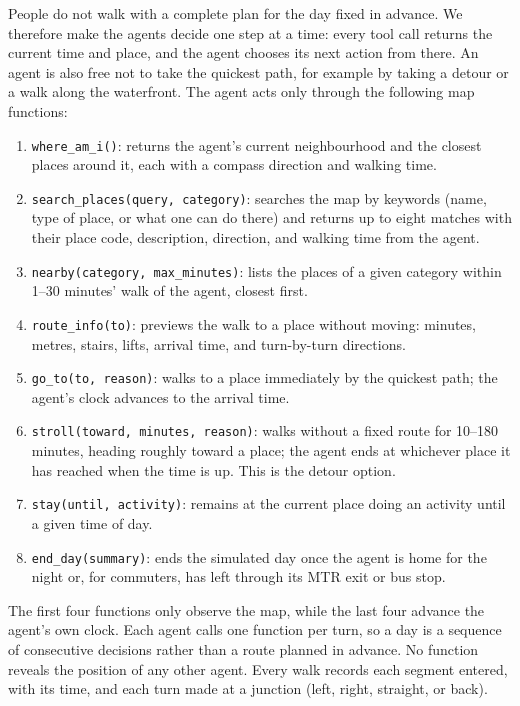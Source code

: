 \documentclass[9pt]{ieeeconf}
\begin{document}
People do not walk with a complete plan for the day fixed in advance. We therefore make the agents decide one step at a time: every tool call returns the current time and place, and the agent chooses its next action from there. An agent is also free not to take the quickest path, for example by taking a detour or a walk along the waterfront. The agent acts only through the following map functions:

\begin{enumerate}
    \item \texttt{where\_am\_i()}: returns the agent's current neighbourhood and the closest places around it, each with a compass direction and walking time.
    \item \texttt{search\_places(query, category)}: searches the map by keywords (name, type of place, or what one can do there) and returns up to eight matches with their place code, description, direction, and walking time from the agent.
    \item \texttt{nearby(category, max\_minutes)}: lists the places of a given category within 1--30 minutes' walk of the agent, closest first.
    \item \texttt{route\_info(to)}: previews the walk to a place without moving: minutes, metres, stairs, lifts, arrival time, and turn-by-turn directions.
    \item \texttt{go\_to(to, reason)}: walks to a place immediately by the quickest path; the agent's clock advances to the arrival time.
    \item \texttt{stroll(toward, minutes, reason)}: walks without a fixed route for 10--180 minutes, heading roughly toward a place; the agent ends at whichever place it has reached when the time is up. This is the detour option.
    \item \texttt{stay(until, activity)}: remains at the current place doing an activity until a given time of day.
    \item \texttt{end\_day(summary)}: ends the simulated day once the agent is home for the night or, for commuters, has left through its MTR exit or bus stop.
\end{enumerate}
The first four functions only observe the map, while the last four advance the agent's own clock. Each agent calls one function per turn, so a day is a sequence of consecutive decisions rather than a route planned in advance. No function reveals the position of any other agent. Every walk records each segment entered, with its time, and each turn made at a junction (left, right, straight, or back).
\end{document}
